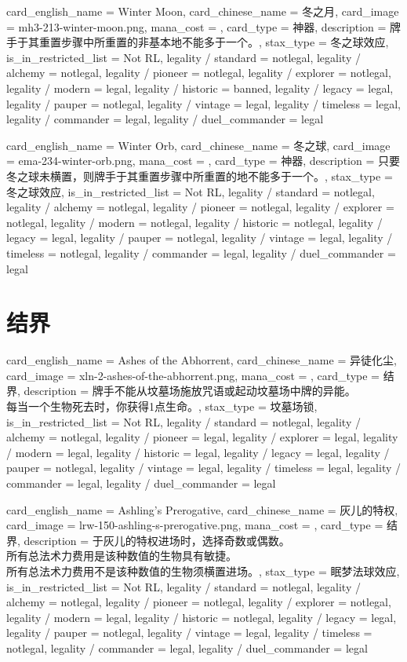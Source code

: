 \documentclass[lang = cn, color = black, 10pt]{AllThatStax}
\begin{document}
\card
{
	card_english_name = {Winter Moon},
	card_chinese_name = {冬之月},
	card_image = mh3-213-winter-moon.png,
	mana_cost = ,
	card_type = 神器,
	description = {牌手于其重置步骤中所重置的非基本地不能多于一个。},
	stax_type = 冬之球效应,
	is_in_restricted_list = Not RL,
	legality / standard = notlegal,
	legality / alchemy = notlegal,
	legality / pioneer = notlegal,
	legality / explorer = notlegal,
	legality / modern = legal,
	legality / historic = banned,
	legality / legacy = legal,
	legality / pauper = notlegal,
	legality / vintage = legal,
	legality / timeless = legal,
	legality / commander = legal,
	legality / duel_commander = legal
}

\card
{
	card_english_name = {Winter Orb},
	card_chinese_name = {冬之球},
	card_image = ema-234-winter-orb.png,
	mana_cost = ,
	card_type = 神器,
	description = {只要冬之球未横置，则牌手于其重置步骤中所重置的地不能多于一个。},
	stax_type = 冬之球效应,
	is_in_restricted_list = Not RL,
	legality / standard = notlegal,
	legality / alchemy = notlegal,
	legality / pioneer = notlegal,
	legality / explorer = notlegal,
	legality / modern = notlegal,
	legality / historic = notlegal,
	legality / legacy = legal,
	legality / pauper = notlegal,
	legality / vintage = legal,
	legality / timeless = notlegal,
	legality / commander = legal,
	legality / duel_commander = legal
}

\section{结界}

\card
{
	card_english_name = {Ashes of the Abhorrent},
	card_chinese_name = {异徒化尘},
	card_image = xln-2-ashes-of-the-abhorrent.png,
	mana_cost = ,
	card_type = 结界,
	description = {牌手不能从坟墓场施放咒语或起动坟墓场中牌的异能。\\
		每当一个生物死去时，你获得1点生命。},
	stax_type = 坟墓场锁,
	is_in_restricted_list = Not RL,
	legality / standard = notlegal,
	legality / alchemy = notlegal,
	legality / pioneer = legal,
	legality / explorer = legal,
	legality / modern = legal,
	legality / historic = legal,
	legality / legacy = legal,
	legality / pauper = notlegal,
	legality / vintage = legal,
	legality / timeless = legal,
	legality / commander = legal,
	legality / duel_commander = legal
}

\card
{
	card_english_name = {Ashling's Prerogative},
	card_chinese_name = {灰儿的特权},
	card_image = lrw-150-ashling-s-prerogative.png,
	mana_cost = ,
	card_type = 结界,
	description = {于灰儿的特权进场时，选择奇数或偶数。 \\
		所有总法术力费用是该种数值的生物具有敏捷。\\
		所有总法术力费用不是该种数值的生物须横置进场。},
	stax_type = 眠梦法球效应,
	is_in_restricted_list = Not RL,
	legality / standard = notlegal,
	legality / alchemy = notlegal,
	legality / pioneer = notlegal,
	legality / explorer = notlegal,
	legality / modern = legal,
	legality / historic = notlegal,
	legality / legacy = legal,
	legality / pauper = notlegal,
	legality / vintage = legal,
	legality / timeless = notlegal,
	legality / commander = legal,
	legality / duel_commander = legal
}
\end{document}
